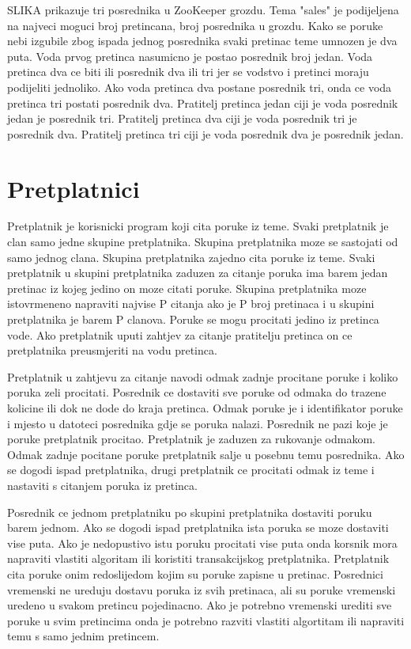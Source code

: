 \documentclass[times, utf8, diplomski, numeric]{fer}
\begin{document}
SLIKA prikazuje tri posrednika u ZooKeeper grozdu. Tema "sales" je podijeljena na najveci moguci broj pretincana, broj posrednika u grozdu. Kako se poruke nebi izgubile zbog ispada jednog posrednika svaki pretinac teme umnozen je dva puta. Voda prvog pretinca nasumicno je postao posrednik broj jedan. Voda pretinca dva ce biti ili posrednik dva ili tri jer se vodstvo i pretinci moraju podijeliti jednoliko. Ako voda pretinca dva postane posrednik tri, onda ce voda pretinca tri postati posrednik dva. Pratitelj pretinca jedan ciji je voda posrednik jedan je posrednik tri. Pratitelj pretinca dva ciji je voda posrednik tri je posrednik dva. Pratitelj pretinca tri ciji je voda posrednik dva je posrednik jedan.



\chapter{Pretplatnici}
Pretplatnik je korisnicki program koji cita poruke iz teme. Svaki pretplatnik je clan samo jedne skupine pretplatnika. Skupina pretplatnika moze se sastojati od samo jednog clana. Skupina pretplatnika zajedno cita poruke iz teme. Svaki pretplatnik u skupini pretplatnika zaduzen za citanje poruka ima barem jedan pretinac iz kojeg jedino on moze citati poruke. Skupina pretplatnika moze istovrmeneno napraviti najvise P citanja ako je P broj pretinaca i u skupini pretplatnika je barem P clanova. Poruke se mogu procitati jedino iz pretinca vode. Ako pretplatnik uputi zahtjev za citanje pratitelju pretinca on ce pretplatnika preusmjeriti na vodu pretinca.

Pretplatnik u zahtjevu za citanje navodi odmak zadnje procitane poruke i koliko poruka zeli procitati. Posrednik ce dostaviti sve poruke od odmaka do trazene kolicine ili dok ne dode do kraja pretinca. Odmak poruke je i identifikator poruke i mjesto u datoteci posrednika gdje se poruka nalazi. Posrednik ne pazi koje je poruke pretplatnik procitao. Pretplatnik je zaduzen za rukovanje odmakom. Odmak zadnje pocitane poruke pretplatnik salje u posebnu temu posrednika. Ako se dogodi ispad pretplatnika, drugi pretplatnik ce procitati odmak iz teme i nastaviti s citanjem poruka iz pretinca.

Posrednik ce jednom pretplatniku po skupini pretplatnika dostaviti poruku barem jednom. Ako se dogodi ispad pretplatnika ista poruka se moze dostaviti vise puta. Ako je nedopustivo istu poruku procitati vise puta onda korsnik mora napraviti vlastiti algoritam ili koristiti transakcijskog pretplatnika. Pretplatnik cita poruke onim redoslijedom kojim su poruke zapisne u pretinac. Posrednici vremenski ne ureduju dostavu poruka iz svih pretinaca, ali su poruke vremenski uredeno u svakom pretincu pojedinacno. Ako je potrebno vremenski urediti sve poruke u svim pretincima onda je potrebno razviti vlastiti algortitam ili napraviti temu s samo jednim pretincem.
\end{document}
